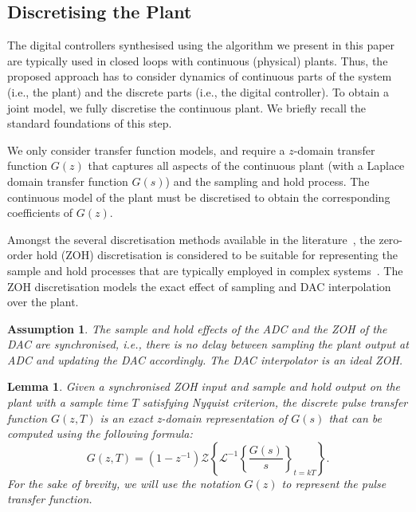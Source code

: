 \documentclass{sig-alternate-05-2015}
\newcommand{\red}[1]{{\color{red}#1}}
\newtheorem{myassumption}{Assumption}
\newtheorem{mylemma}{Lemma}
\begin{document}
\subsection{Discretising the Plant}
\label{ssec:SandH}

The digital controllers synthesised using the algorithm we present in this
paper are typically used in closed loops with continuous (physical)
plants.  Thus, the proposed approach has to consider dynamics of continuous
parts of the system (i.e., the plant) and the discrete parts (i.e., the
digital controller).  To obtain a joint model, we fully discretise the continuous
plant. We briefly recall the standard foundations of this step.

We only consider transfer function models, and require a $z$-domain
transfer function $G(z)$ that captures all aspects of the continuous plant (with a
Laplace domain transfer function $G(s)$) and the sampling and hold process.
The continuous model of the plant must be discretised to obtain the corresponding 
coefficients of $G(z)$.


Amongst the several discretisation methods available in the
literature~\cite{Franklin15}, the zero-order hold (ZOH) discretisation is
considered to be suitable for representing the sample and hold processes that are
typically employed in complex systems~\cite{istepanian2012digital}. 
The ZOH discretisation models the exact effect of sampling and DAC interpolation over the plant.

\begin{myassumption}
%
The sample and hold effects of the ADC and the ZOH of the DAC are synchronised,
i.e., there is no delay between sampling the plant output at ADC and
updating the DAC accordingly.  The DAC interpolator is an ideal ZOH. 
%
\end{myassumption}

\begin{mylemma}\cite{astrom1997computer}
%
Given a synchronised ZOH input and sample and hold output on the plant with
a sample time $T$ satisfying Nyquist criterion, the discrete pulse
transfer function $G(z,T)$ is an exact z-domain representation of $G(s)$ 
that can be computed using the following formula:
%
\begin{equation}
\label{eq:pulsetf}
G(z,T) = %
(1-z^{-1})\mathcal{Z}\left\lbrace{\mathcal{L}^{-1}\left\lbrace{\frac{G(s)}{s}}\right\rbrace_{t=kT}}\right\rbrace.
\end{equation}
%
For the sake of brevity, we will use the notation $G(z)$ to represent the
pulse transfer function.
%
\end{mylemma}
\end{document}
